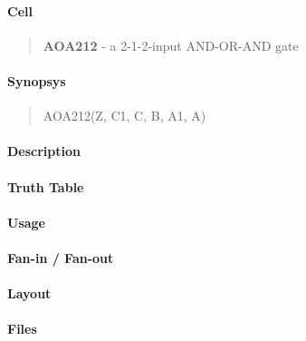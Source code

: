 \label{AOA212}
\paragraph{Cell}
\begin{quote}
    \textbf{AOA212} - a 2-1-2-input AND-OR-AND gate
\end{quote}

\paragraph{Synopsys}
\begin{quote}
    AOA212(Z, C1, C, B, A1, A)
\end{quote}

\paragraph{Description}

%

\paragraph{Truth Table}
%

\paragraph{Usage}

\paragraph{Fan-in / Fan-out}

\paragraph{Layout}

\paragraph{Files}
